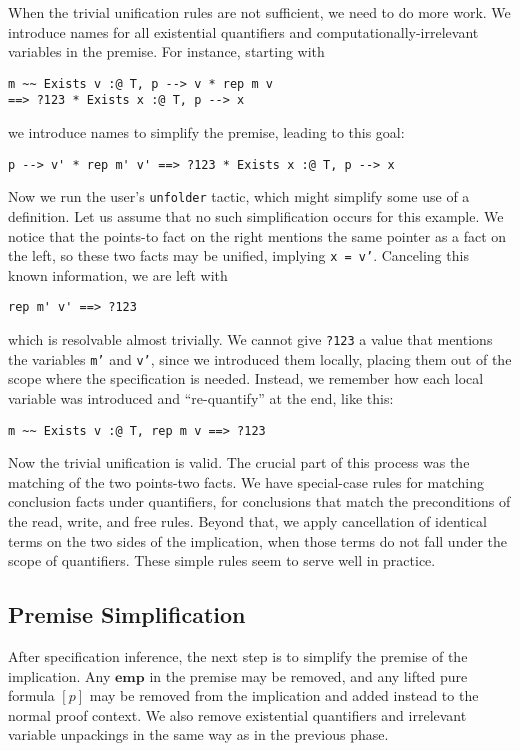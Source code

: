 \documentclass[preprint,nocopyrightspace]{sigplanconf}
\newcommand{\cd}[1]{\texttt{#1}}
\newcommand{\emp}{\mathbf{emp}}
\begin{document}
When the trivial unification rules are not sufficient, we need to do more work.  We introduce names for all existential quantifiers and computationally-irrelevant variables in the premise.  For instance, starting with
\begin{verbatim}
m ~~ Exists v :@ T, p --> v * rep m v
==> ?123 * Exists x :@ T, p --> x
\end{verbatim}
we introduce names to simplify the premise, leading to this goal:
\begin{verbatim}
p --> v' * rep m' v' ==> ?123 * Exists x :@ T, p --> x
\end{verbatim}
Now we run the user's \cd{unfolder} tactic, which might simplify some use of a definition.  Let us assume that no such simplification occurs for this example.  We notice that the points-to fact on the right mentions the same pointer as a fact on the left, so these two facts may be unified, implying \cd{x = v'}.  Canceling this known information, we are left with
\begin{verbatim}
rep m' v' ==> ?123
\end{verbatim}
which is resolvable almost trivially.  We cannot give \cd{?123} a value that mentions the variables \cd{m'} and \cd{v'}, since we introduced them locally, placing them out of the scope where the specification is needed.  Instead, we remember how each local variable was introduced and ``re-quantify'' at the end, like this:
\begin{verbatim}
m ~~ Exists v :@ T, rep m v ==> ?123
\end{verbatim}
Now the trivial unification is valid.  The crucial part of this process was the matching of the two points-two facts.  We have special-case rules for matching conclusion facts under quantifiers, for conclusions that match the preconditions of the read, write, and free rules.  Beyond that, we apply cancellation of identical terms on the two sides of the implication, when those terms do not fall under the scope of quantifiers.  These simple rules seem to serve well in practice.

\subsection{Premise Simplification}

After specification inference, the next step is to simplify the premise of the implication.  Any $\emp$ in the premise may be removed, and any lifted pure formula $[p]$ may be removed from the implication and added instead to the normal proof context.  We also remove existential quantifiers and irrelevant variable unpackings in the same way as in the previous phase.
\end{document}
